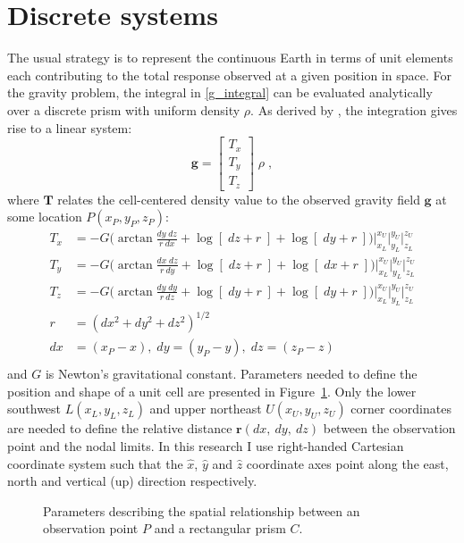 \section{Discrete systems}
The usual strategy is to represent the continuous Earth in terms of unit elements each contributing to the total response observed at a given position in space.
For the gravity problem, the integral in \eqref{g_integral} can be evaluated analytically over a discrete prism with uniform density $\rho$. As derived by \cite[]{Nagy66}, the integration gives rise to a linear system:
\begin{equation} \mathbf{g} = \begin{bmatrix} T_{x} \\ T_{y} \\ T_{z} \end{bmatrix} \; \rho \;, \label{gfield} \end{equation}
where $\mathbf{T}$ relates the cell-centered density value to the observed gravity field $\mathbf{g}$ at some location $P(x_P, y_P, z_P)$:
\begin{equation}
\begin{split}
T_{x} &= -G \bigg( \arctan \frac{dy\;dz}{r\:dx} + \log \left[\; dz + r\;\right] + \log \left[\; dy + r\;\right] \bigg) \bigg|_{x_L}^{x_U} \bigg|_{y_L}^{y_U} \bigg|_{z_L}^{z_U}\\
T_{y} &= -G \bigg( \arctan \frac{dx\;dz}{r\:dy} + \log \left[\; dz + r\;\right] + \log \left[\; dx + r\;\right] \bigg) \bigg|_{x_L}^{x_U} \bigg|_{y_L}^{y_U} \bigg|_{z_L}^{z_U}\\
T_{z} &= -G \bigg( \arctan \frac{dy\;dy}{r\:dz} + \log \left[\; dy + r\;\right] + \log \left[\; dy + r\;\right] \bigg) \bigg|_{x_L}^{x_U} \bigg|_{y_L}^{y_U} \bigg|_{z_L}^{z_U}\\
r &= (dx^2 + dy^2 + dz^2)^{1/2} \\
dx &= (x_P - x), \; dy = (y_P - y),\; dz = (z_P - z)\\
\end{split}
\label{Tmatrix}
\end{equation}
and $G$ is Newton's gravitational constant.
Parameters needed to define the position and shape of a unit cell are presented in Figure~\ref{UnitCube}. Only the lower southwest $L(x_L,y_L,z_L)$ and upper northeast $U(x_U,y_U,z_U)$ corner coordinates are needed to define the relative distance $\mathbf{r} (dx,\:dy,\:dz)$ between the observation point and the nodal limits. In this research I use right-handed Cartesian coordinate system such that the $\hat x$, $\hat y$ and $\hat z$ coordinate axes point along the east, north and vertical (up) direction respectively.
\begin{figure}[h!]
\caption{Parameters describing the spatial relationship between an observation point $P$ and a rectangular prism $C$.}
\label{UnitCube}
\end{figure}

